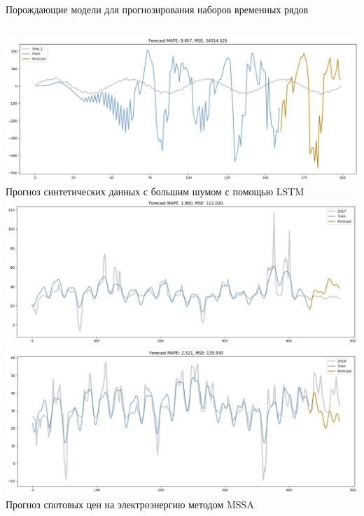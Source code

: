\documentclass{beamer}
\begin{document}
\begin{frame}{Порождающие модели для прогнозирования наборов временных рядов}
\begin{columns}[c]
\includegraphics[width=1\textwidth]{fig/sin_lstm_high_ampl.png}
    Прогноз синтетических данных с большим шумом с помощью LSTM
\includegraphics[width=1.0\textwidth]{real_data_2017.png}
\includegraphics[width=1.0\textwidth]{real_data_2018.png}
    Прогноз спотовых цен на электроэнергию методом MSSA
\end{columns}

\end{frame}



\end{document}
